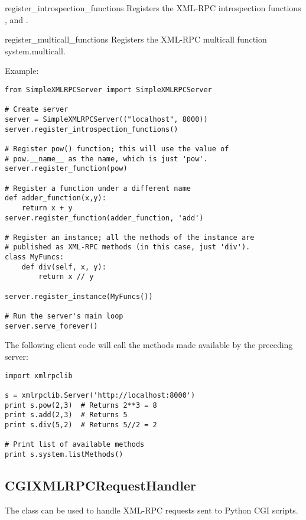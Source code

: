 \begin{methoddesc}{register_introspection_functions}{}
  Registers the XML-RPC introspection functions ,
   and . 
\end{methoddesc}

\begin{methoddesc}{register_multicall_functions}{}
  Registers the XML-RPC multicall function system.multicall.
\end{methoddesc}

Example:

\begin{verbatim}
from SimpleXMLRPCServer import SimpleXMLRPCServer

# Create server
server = SimpleXMLRPCServer(("localhost", 8000))
server.register_introspection_functions()

# Register pow() function; this will use the value of 
# pow.__name__ as the name, which is just 'pow'.
server.register_function(pow)

# Register a function under a different name
def adder_function(x,y):
    return x + y
server.register_function(adder_function, 'add')

# Register an instance; all the methods of the instance are 
# published as XML-RPC methods (in this case, just 'div').
class MyFuncs:
    def div(self, x, y): 
        return x // y
    
server.register_instance(MyFuncs())

# Run the server's main loop
server.serve_forever()
\end{verbatim}

The following client code will call the methods made available by 
the preceding server:

\begin{verbatim}
import xmlrpclib

s = xmlrpclib.Server('http://localhost:8000')
print s.pow(2,3)  # Returns 2**3 = 8
print s.add(2,3)  # Returns 5
print s.div(5,2)  # Returns 5//2 = 2

# Print list of available methods
print s.system.listMethods()
\end{verbatim}


\subsection{CGIXMLRPCRequestHandler}

The  class can be used to 
handle XML-RPC requests sent to Python CGI scripts.

